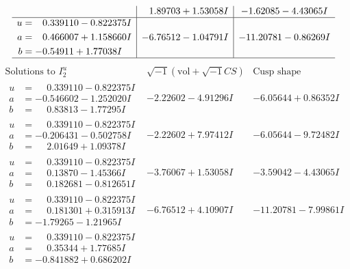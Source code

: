 \documentclass[1p]{elsarticle_modified}
\theoremstyle{definition}
\newcommand{\I}{\sqrt{-1}}
\begin{document}
$$\begin{array}{c|c|c}
 & \phantom{-}1.89703 + 1.53058 I & -1.62085 - 4.43065 I \\ \hline\begin{aligned}
u &= \phantom{-}0.339110 - 0.822375 I \\
a &= \phantom{-}0.466007 + 1.158660 I \\
b &= -0.54911 + 1.77038 I\end{aligned}
 & -6.76512 - 1.04791 I & -11.20781 - 0.86269 I\\
 \hline 
 \end{array}$$\newpage$$\begin{array}{c|c|c}  
\text{Solutions to }I^u_{2}& \I (\text{vol} + \sqrt{-1}CS) & \text{Cusp shape}\\
 \hline 
\begin{aligned}
u &= \phantom{-}0.339110 - 0.822375 I \\
a &= -0.546602 - 1.252020 I \\
b &= \phantom{-}0.83813 - 1.77295 I\end{aligned}
 & -2.22602 - 4.91296 I & -6.05644 + 0.86352 I \\ \hline\begin{aligned}
u &= \phantom{-}0.339110 - 0.822375 I \\
a &= -0.206431 - 0.502758 I \\
b &= \phantom{-}2.01649 + 1.09378 I\end{aligned}
 & -2.22602 + 7.97412 I & -6.05644 - 9.72482 I \\ \hline\begin{aligned}
u &= \phantom{-}0.339110 - 0.822375 I \\
a &= \phantom{-}0.13870 - 1.45366 I \\
b &= \phantom{-}0.182681 - 0.812651 I\end{aligned}
 & -3.76067 + 1.53058 I & -3.59042 - 4.43065 I \\ \hline\begin{aligned}
u &= \phantom{-}0.339110 - 0.822375 I \\
a &= \phantom{-}0.181301 + 0.315913 I \\
b &= -1.79265 - 1.21965 I\end{aligned}
 & -6.76512 + 4.10907 I & -11.20781 - 7.99861 I \\ \hline\begin{aligned}
u &= \phantom{-}0.339110 - 0.822375 I \\
a &= \phantom{-}0.35344 + 1.77685 I \\
b &= -0.841882 + 0.686202 I\end{aligned}

\end{array}$$
\end{document}
